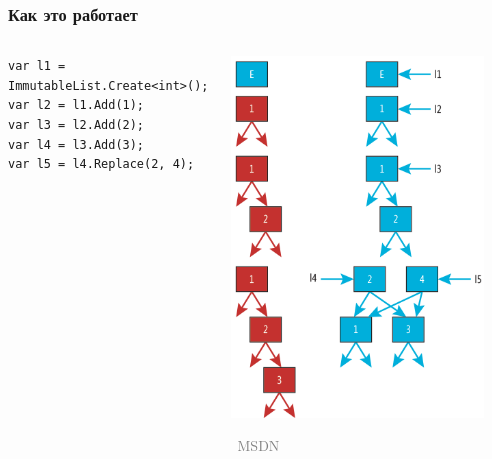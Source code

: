 \documentclass[xetex,mathserif,serif]{beamer}
\newcommand{\attribution}[1] {
\vspace{-2mm}\begin{flushright}\begin{scriptsize}\textcolor{gray}{\textcopyright\, #1}\end{scriptsize}\end{flushright}
}
\begin{document}
	\begin{frame}[fragile]
		\frametitle{Как это работает}
		\begin{columns}
			\begin{column}{0.6\textwidth}
				\begin{footnotesize}
					\begin{verbatim}
var l1 = ImmutableList.Create<int>();
var l2 = l1.Add(1);
var l3 = l2.Add(2);
var l4 = l3.Add(3);
var l5 = l4.Replace(2, 4);
					\end{verbatim}
				\end{footnotesize}
			\end{column}
			\begin{column}{0.4\textwidth}
				\includegraphics[width=0.9\textwidth]{lists.png}
				\attribution{MSDN}
			\end{column}
		\end{columns}
	\end{frame}
\end{document}
